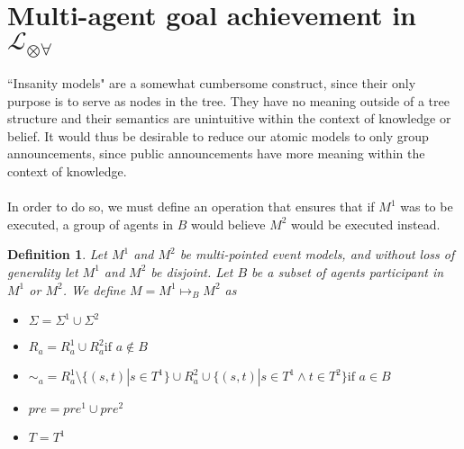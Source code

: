 \documentclass[12pt, a4paper, titlepage]{scrartcl}
\newtheorem{defn}{Definition}[subsection]
\numberwithin{equation}{section}
\newcommand{\lang}{\mathcal{L}}
\newcommand{\langArbAct}{\lang_{\otimes\forall}}
\begin{document}
\section{Multi-agent goal achievement in $\langArbAct$}

``Insanity models" are a somewhat cumbersome construct, since their only purpose
is to serve as nodes in the tree.
They have no meaning outside of a tree structure and their semantics are
unintuitive within the context of knowledge or belief.
It would thus be desirable to reduce our atomic models to only group
announcements, since public announcements have more meaning within the context of
knowledge.\\
\\
In order to do so, we must define an operation that ensures that if $M^1$ was to
be executed, a group of agents in $B$ would believe $M^2$ would be executed
instead.
\begin{defn} \label{possTwo}
Let $M^1$ and $M^2$ be multi-pointed event models, and without loss of
generality let $M^1$ and $M^2$ be disjoint.
Let $B$ be a subset of agents participant in $M^1$ or $M^2$.
We define $M = M^1 \mapsto_B M^2$ as 
\begin{itemize}
  \item $\Sigma = \Sigma^1 \cup \Sigma^2$
  \item $R_a =
    R^1_a \cup R^2_a \text{if } a \notin B$
	\item $\sim_a =
      R^1_a \setminus \{(s,t) | s \in T^1 \} \cup
      R^2_a \cup
      \{(s,t) | s \in T^1 \land t \in T^2 \}
    \text{if } a \in B$
  \item $pre = pre^1 \cup pre^2$
  \item $T = T^1$
\end{itemize}
\end{defn}
\end{document}
